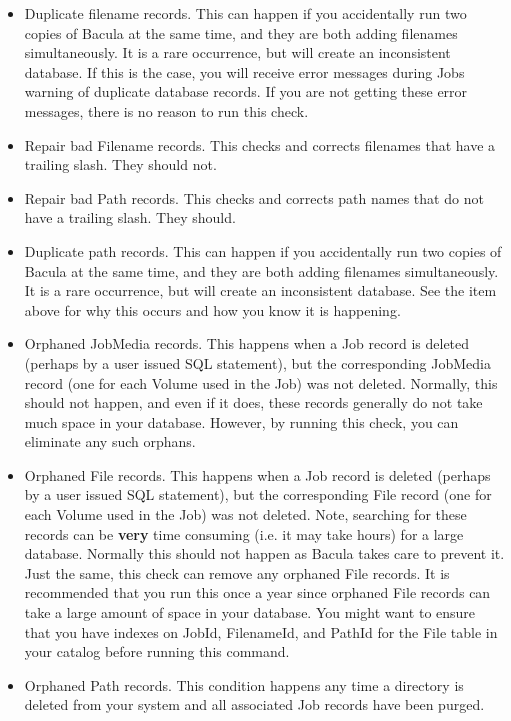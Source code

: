 \begin{itemize}
\item Duplicate filename records. This can happen if you accidentally run  two
   copies of Bacula at the same time, and they are both adding  filenames
   simultaneously. It is a rare occurrence, but will create  an inconsistent
   database. If this is the case, you will receive  error messages during Jobs
   warning of duplicate database records.  If you are not getting these error
   messages, there is no reason  to run this check.
\item Repair bad Filename records. This checks and corrects filenames  that
   have a trailing slash. They should not.
\item Repair bad Path records. This checks and corrects path names  that do
   not have a trailing slash. They should.
\item Duplicate path records. This can happen if you accidentally run  two
   copies of Bacula at the same time, and they are both adding  filenames
   simultaneously. It is a rare occurrence, but will create  an inconsistent
   database. See the item above for why this occurs and  how you know it is
   happening.
\item Orphaned JobMedia records. This happens when a Job record is deleted
   (perhaps by a user issued SQL statement), but the corresponding  JobMedia
   record (one for each Volume used in the Job) was not deleted.  Normally, this
   should not happen, and even if it does, these records  generally do not take
   much space in your database. However, by running  this check, you can
   eliminate any such orphans.
\item Orphaned File records. This happens when a Job record is deleted
   (perhaps by a user issued SQL statement), but the corresponding  File record
   (one for each Volume used in the Job) was not deleted.  Note, searching for
   these records can be {\bf very} time consuming (i.e.  it may take hours) for a
   large database. Normally this should not  happen as Bacula takes care to
   prevent it. Just the same, this  check can remove any orphaned File records.
   It is recommended that  you run this once a year since orphaned File records
   can take a  large amount of space in your database. You might
   want to ensure that you have indexes on JobId, FilenameId, and
   PathId for the File table in your catalog before running this
   command.
\item Orphaned Path records. This condition happens any time a directory is
   deleted from your system and all associated Job records have been purged.

\end{itemize}
